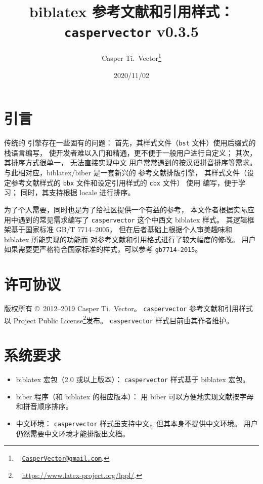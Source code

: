 \documentclass[UTF8]{ctexart}
\newcommand*{\cupercite}[1]{\supercite{#1}\mbox{}}
\begin{document}
\title{\textbf{biblatex 参考文献和引用样式：\texttt{caspervector} v0.3.5}}
\author{%
	Casper Ti.\ Vector\thanks{\ %
		\href{mailto:CasperVector@gmail.com}{\texttt{CasperVector@gmail.com}}.%
	}%
}
\date{2020/11/02}
\maketitle

\section{引言}

传统的  引擎存在一些固有的问题：
首先，其样式文件（\verb|bst| 文件）使用后缀式的栈语言编写，
使开发者难以入门和精通，更不便于一般用户进行自定义；
其次，其排序方式很单一，
无法直接实现中文  用户常常遇到的按汉语拼音排序等需求。
与此相对应，biblatex\cupercite{biblatex}/biber\cupercite{biber}
是一套新兴的  参考文献排版引擎，
其样式文件（设定参考文献样式的 \verb|bbx| 文件和设定引用样式的 \verb|cbx| 文件）
使用  编写，便于学习；
同时，其支持根据 locale 进行排序。

为了个人需要，同时也是为了给社区提供一个有益的参考，
本文作者根据实际应用中遇到的常见需求编写了
\verb|caspervector| 这个中西文 biblatex 样式。
其逻辑框架基于国家标准 GB/T 7714--2005\cupercite{gbt7714-2005}，
但在后者基础上根据个人审美趣味和 biblatex 所能实现的功能而
对参考文献和引用格式进行了较大幅度的修改。
用户如果需要更严格符合国家标准的样式，可以参考
\verb|gb7714-2015|\cupercite{blx-gb7714-2015}。

\section{许可协议}

版权所有 \copyright\ 2012--2019 Casper Ti.\ Vector。%
\verb|caspervector| 参考文献和引用样式以
 Project Public License\footnote{\ %
	\url{https://www.latex-project.org/lppl/}.%
}发布。%
\verb|caspervector| 样式目前由其作者维护。

\section{系统要求}

\begin{itemize}
	\item biblatex 宏包（2.0 或以上版本）：%
		\verb|caspervector| 样式基于 biblatex 宏包。
	\item biber 程序（和 biblatex 的相应版本）：
		用 biber 可以方便地实现文献按字母和拼音顺序排序。
	\item 中文环境：%
		\verb|caspervector| 样式虽支持中文，但其本身不提供中文环境。
		用户仍然需要中文环境才能排版出文档。
\end{itemize}
\end{document}
